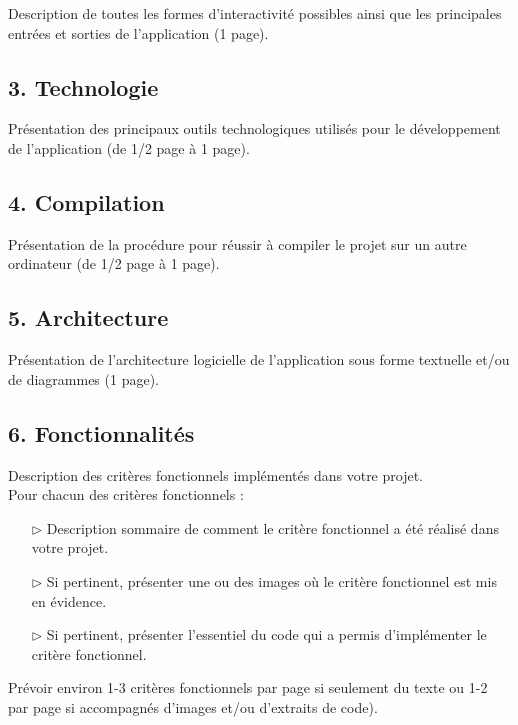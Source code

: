\documentclass[12pt]{article}
\newcommand{\state}{\noindent}
\begin{document}
\state
Description de toutes les formes d'interactivité possibles ainsi que les principales entrées et sorties de l'application (1 page).

\subsection*{3. Technologie}

\state
Présentation des principaux outils technologiques utilisés pour le développement de l'application (de 1/2 page à 1 page).

\subsection*{4. Compilation}

\state
Présentation de la procédure pour réussir à compiler le projet sur un autre ordinateur (de 1/2 page à 1 page).

\subsection*{5. Architecture}

\state
Présentation de l'architecture logicielle de l'application sous forme textuelle et/ou de diagrammes (1 page).

\pagebreak

\subsection*{6. Fonctionnalités}

\state
Description des critères fonctionnels implémentés dans votre projet. \\

\state
Pour chacun des critères fonctionnels :

\begin{itemize}
\item[$\triangleright$]
Description sommaire de comment le critère fonctionnel a été réalisé dans votre projet.
\item[$\triangleright$]
Si pertinent, présenter une ou des images où le critère fonctionnel est mis en évidence.
\item[$\triangleright$]
Si pertinent, présenter l'essentiel du code qui a permis d'implémenter le critère fonctionnel. \\
\end{itemize}

\state
Prévoir environ 1-3 critères fonctionnels par page si seulement du texte ou 1-2 par page si accompagnés d'images et/ou d'extraits de code).
\end{document}
